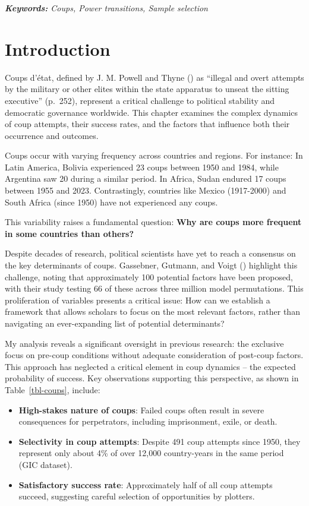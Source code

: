 \documentclass[
  12pt,
]{report}
\begin{document}
\emph{\textbf{Keywords:} Coups, Power transitions, Sample selection}

\newpage

\section{Introduction}\label{introduction-1}

Coups d'état, defined by J. M. Powell and Thyne
() as ``illegal and overt attempts by the
military or other elites within the state apparatus to unseat the
sitting executive'' (p.~252), represent a critical challenge to
political stability and democratic governance worldwide. This chapter
examines the complex dynamics of coup attempts, their success rates, and
the factors that influence both their occurrence and outcomes.

Coups occur with varying frequency across countries and regions. For
instance: In Latin America, Bolivia experienced 23 coups between 1950
and 1984, while Argentina saw 20 during a similar period. In Africa,
Sudan endured 17 coups between 1955 and 2023. Contrastingly, countries
like Mexico (1917-2000) and South Africa (since 1950) have not
experienced any coups.

This variability raises a fundamental question: \textbf{Why are coups
more frequent in some countries than others?}

Despite decades of research, political scientists have yet to reach a
consensus on the key determinants of coups. Gassebner, Gutmann, and
Voigt () highlight this challenge,
noting that approximately 100 potential factors have been proposed, with
their study testing 66 of these across three million model permutations.
This proliferation of variables presents a critical issue: How can we
establish a framework that allows scholars to focus on the most relevant
factors, rather than navigating an ever-expanding list of potential
determinants?

My analysis reveals a significant oversight in previous research: the
exclusive focus on pre-coup conditions without adequate consideration of
post-coup factors. This approach has neglected a critical element in
coup dynamics -- the expected probability of success. Key observations
supporting this perspective, as shown in Table~\ref{tbl-coups}, include:

\begin{itemize}
\item
  \textbf{High-stakes nature of coups}: Failed coups often result in
  severe consequences for perpetrators, including imprisonment, exile,
  or death.
\item
  \textbf{Selectivity in coup attempts}: Despite 491 coup attempts since
  1950, they represent only about 4\% of over 12,000 country-years in
  the same period (GIC dataset).
\item
  \textbf{Satisfactory success rate}: Approximately half of all coup
  attempts succeed, suggesting careful selection of opportunities by
  plotters.
\end{itemize}
\end{document}
